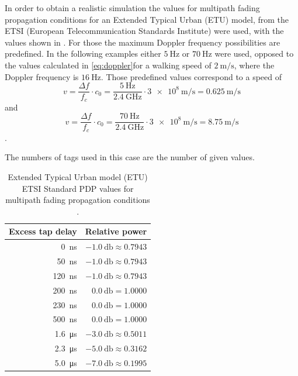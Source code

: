 In order to obtain a realistic simulation the values for multipath fading propagation conditions for an Extended Typical Urban (ETU) model, from the ETSI (European Telecommunication Standards Institute) were used\cite{ETSI}, with the values shown in . For those the maximum Doppler frequency possibilities are predefined. In the following examples  either \(\SI{5}{\hertz}\) or \(\SI{70}{\hertz}\) were used, opposed to the values calculated in \eqref{eq:doppler}for a walking speed of \(\SI{2}{\meter\per\second}\), where the Doppler frequency is \(\SI{16}{\hertz}\). Those predefined values correspond to a speed of
\begin{equation}
	v = \frac{\Delta f}{f_c}\cdot c_0 = \frac{\SI{5}{\hertz}}{\SI{2.4}{\giga\hertz}}\cdot \SI{3e8}{\meter\per\second}= \SI{0.625}{\meter\per\second}
\end{equation}
and
\begin{equation}
	v = \frac{\Delta f}{f_c}\cdot c_0 = \frac{\SI{70}{\hertz}}{\SI{2.4}{\giga\hertz}}\cdot \SI{3e8}{\meter\per\second}= \SI{8.75}{\meter\per\second}
\end{equation}.

The numbers of tags used in this case are the number of given values.

\begin{table}[b]
	\centering
	\begin{tabular}{rr}
		\toprule
		\bfseries Excess tap delay & \bfseries Relative power \\
		\midrule
		\SI{   0}{\nano\second} & \(\SI{-1.0}{\decibel} \approx 0.7943\) \\
		\SI{  50}{\nano\second} & \(\SI{-1.0}{\decibel} \approx 0.7943\) \\
		\SI{ 120}{\nano\second} & \(\SI{-1.0}{\decibel} \approx 0.7943\) \\
		\SI{ 200}{\nano\second} & \(\SI{ 0.0}{\decibel} = 1.0000\) \\
		\SI{ 230}{\nano\second} & \(\SI{ 0.0}{\decibel} = 1.0000\) \\
		\SI{ 500}{\nano\second} & \(\SI{ 0.0}{\decibel} = 1.0000\) \\
		\SI{1.6}{\micro\second} & \(\SI{-3.0}{\decibel} \approx 0.5011\) \\
		\SI{2.3}{\micro\second} & \(\SI{-5.0}{\decibel} \approx 0.3162\) \\
		\SI{5.0}{\micro\second} & \(\SI{-7.0}{\decibel} \approx 0.1995\) \\
		\bottomrule
	\end{tabular}
	\caption{Extended Typical Urban model (ETU) ETSI Standard PDP values for multipath fading propagation conditions \cite{ETSI}. \label{tab:etsi-tap-values}}
\end{table}

